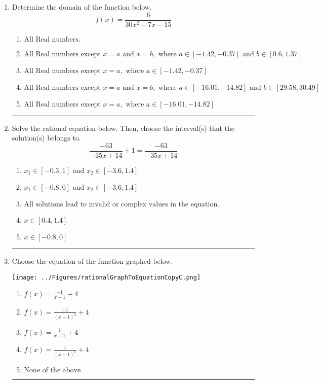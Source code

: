 \documentclass[14pt]{extbook}
\newcommand{\litem}[1]{\item#1\hspace*{-1cm}\rule{\textwidth}{0.4pt}}
\begin{document}
\begin{enumerate}
\litem{
Determine the domain of the function below.\[ f(x) = \frac{6}{30x^{2} -7 x -15} \]\begin{enumerate}[label=\Alph*.]
\item \( \text{All Real numbers.} \)
\item \( \text{All Real numbers except } x = a \text{ and } x = b, \text{ where } a \in [-1.42, -0.37] \text{ and } b \in [0.6, 1.37] \)
\item \( \text{All Real numbers except } x = a, \text{ where } a \in [-1.42, -0.37] \)
\item \( \text{All Real numbers except } x = a \text{ and } x = b, \text{ where } a \in [-16.01, -14.82] \text{ and } b \in [29.58, 30.49] \)
\item \( \text{All Real numbers except } x = a, \text{ where } a \in [-16.01, -14.82] \)

\end{enumerate} }
\litem{
Solve the rational equation below. Then, choose the interval(s) that the solution(s) belongs to.\[ \frac{-63}{-35x + 14} + 1 = \frac{-63}{-35x + 14} \]\begin{enumerate}[label=\Alph*.]
\item \( x_1 \in [-0.3, 1] \text{ and } x_2 \in [-3.6,1.4] \)
\item \( x_1 \in [-0.8, 0] \text{ and } x_2 \in [-3.6,1.4] \)
\item \( \text{All solutions lead to invalid or complex values in the equation.} \)
\item \( x \in [0.4,1.4] \)
\item \( x \in [-0.8,0] \)

\end{enumerate} }
\litem{
Choose the equation of the function graphed below.
\begin{center}
    \texttt{[image: ../Figures/rationalGraphToEquationCopyC.png]}
\end{center}
\begin{enumerate}[label=\Alph*.]
\item \( f(x) = \frac{-1}{x + 1} + 4 \)
\item \( f(x) = \frac{-1}{(x + 1)^2} + 4 \)
\item \( f(x) = \frac{1}{x - 1} + 4 \)
\item \( f(x) = \frac{1}{(x - 1)^2} + 4 \)
\item \( \text{None of the above} \)


\end{enumerate}}
\end{enumerate}
\end{document}
